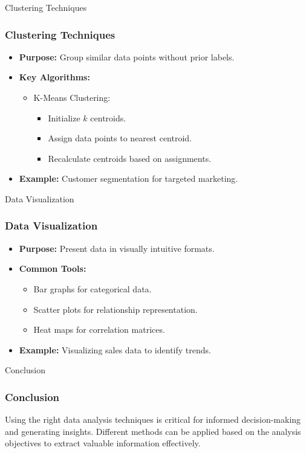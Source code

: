 \documentclass[aspectratio=169]{beamer}
\begin{document}
\begin{frame}{Clustering Techniques}
    \frametitle{Clustering Techniques}
    \begin{itemize}
        \item \textbf{Purpose:} Group similar data points without prior labels.
        \item \textbf{Key Algorithms:}
        \begin{itemize}
            \item K-Means Clustering: 
            \begin{itemize}
                \item Initialize \(k\) centroids.
                \item Assign data points to nearest centroid.
                \item Recalculate centroids based on assignments.
            \end{itemize}
        \end{itemize}
        \item \textbf{Example:} Customer segmentation for targeted marketing.
    \end{itemize}
\end{frame}

\begin{frame}{Data Visualization}
    \frametitle{Data Visualization}
    \begin{itemize}
        \item \textbf{Purpose:} Present data in visually intuitive formats.
        \item \textbf{Common Tools:}
        \begin{itemize}
            \item Bar graphs for categorical data.
            \item Scatter plots for relationship representation.
            \item Heat maps for correlation matrices.
        \end{itemize}
        \item \textbf{Example:} Visualizing sales data to identify trends.
    \end{itemize}
\end{frame}

\begin{frame}{Conclusion}
    \frametitle{Conclusion}
    Using the right data analysis techniques is critical for informed decision-making and generating insights. Different methods can be applied based on the analysis objectives to extract valuable information effectively.
\end{frame}
\end{document}
